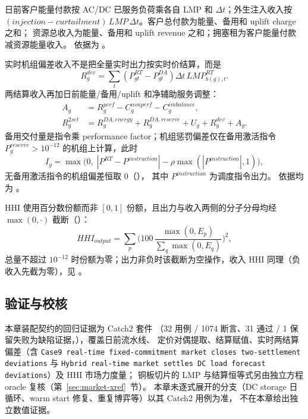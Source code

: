日前客户能量付款按 AC/DC 已服务负荷乘各自 LMP 和 $\Delta t$；外生注入收入按
$(injection-curtailment)\,LMP\,\Delta t$。客户总付款为能量、备用和 uplift charge 之和；
资源总收入为能量、备用和 uplift revenue 之和；拥塞租为客户能量付款减资源能量收入。
依据为 。

实时机组偏差收入不是把全量实时出力按实时价结算，而是
\begin{equation}
 R_g^{dev}=\sum_t(P_{gt}^{RT}-P_{gt}^{DA})\Delta t\,LMP_{b(g),t}^{RT}.
\end{equation}
两结算收入再加日前能量/备用/uplift 和净辅助服务调整：
\begin{align}
 A_g&=R_g^{perf}-C_g^{nonperf}-C_g^{imbalance},\\
 R_g^{2set}&=R_g^{DA,energy}+R_g^{DA,reserve}+U_g+R_g^{dev}+A_g.
\end{align}
备用交付量是指令乘 performance factor；机组惩罚偏差仅在备用激活指令
$P^{reserve}_g>10^{-12}$ 的机组上计算，此时
\begin{equation}
 I_g=\max\!\big(0,\;|P^{RT}-P^{instruction}|-\rho\max(|P^{instruction}|,1)\big),
\end{equation}
无备用激活指令的机组偏差恒取 $0$（），
其中 $P^{instruction}$ 为调度指令出力。
依据均为 。

HHI 使用百分数份额而非 $[0,1]$ 份额，且出力与收入两侧的分子分母均经 $\max(0,\cdot)$
截断（）：
\begin{equation}
 HHI_{output}=\sum_p\Big(100\,\frac{\max(0,E_p)}{\sum_q\max(0,E_q)}\Big)^{\!2},
\end{equation}
总量不超过 $10^{-12}$ 时份额为零；出力非负时该截断为空操作，收入 HHI 同理（负收入先截为零），见
。

\subsection{验证与校核}

本章装配契约的回归证据为 Catch2 套件 
（32 用例 / 1074 断言、31 通过 / 1 保留失败为缺陷证据，），覆盖日前流水线、
定价对偶提取、结算赋值、实时两结算偏差（含
\texttt{Case9 real-time fixed-commitment market closes two-settlement deviations} 与
\texttt{Hybrid real-time market settles DC load forecast deviations}）及 HHI 市场力度量；
铜板切片的 LMP 与结算恒等式另由独立方程 oracle 复核（第~\ref{sec:market-xref}~节）。
本章未逐式展开的分支（DC storage 日循环、warm start 修复、重复博弈等）以其 Catch2 用例为准，
不在本章给出独立数值证据。


